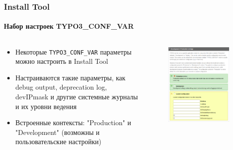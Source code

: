 \begin{frame}[fragile]
	\frametitle{Install Tool}
	\framesubtitle{Набор настроек TYPO3\_CONF\_VAR}

	\begin{columns}[T]
		\begin{column}{.5\textwidth}

			\begin{itemize}
				\item Некоторые \texttt{TYPO3\_CONF\_VAR} параметры можно настроить в Install Tool
				\item Настраиваются такие параметры, как debug output, deprecation log, devIPmask и другие системные
				журналы и их уровни ведения
				\item Встроенные контексты: "Production" и "Development"\newline
					(возможны и пользовательские настройки)
			\end{itemize}

		\end{column}
		\begin{column}{.5\textwidth}

			\begin{figure}\vspace*{-0.4cm}
				\includegraphics[width=0.8\linewidth]{Images/InstallTool/ApplicationContext.png}
			\end{figure}

		\end{column}
	\end{columns}

\end{frame}

